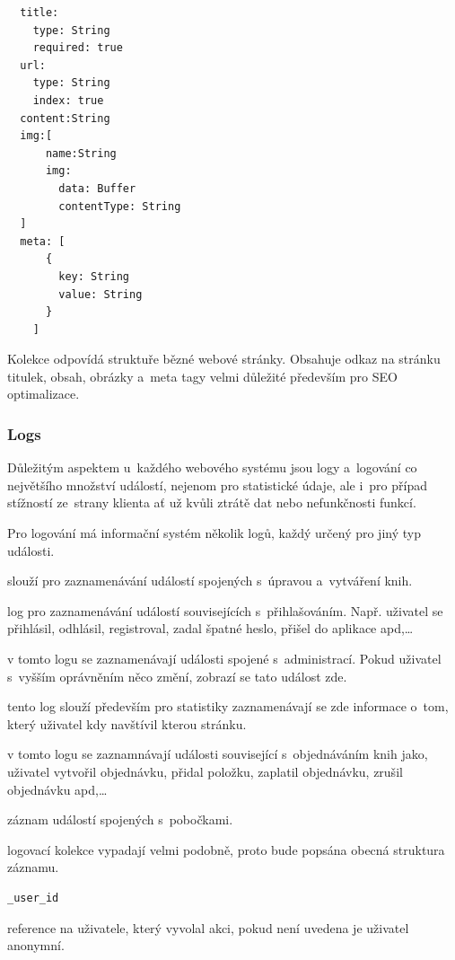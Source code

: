 \documentclass[a4paper,12pt,twoside,BCOR=10mm]{article}
\newenvironment{codeframe}{%
  \begin{Sbox} 
    \begin{minipage} 
      {\columnwidth-\leftmargin-\rightmargin-2\fboxsep-2\fboxrule-4pt} 
}{%

  \end{minipage} 
  \end{Sbox} 
  \begin{center} 
    \fcolorbox{black}{codeback}{\TheSbox} 
  \end{center} 
}
\begin{document}
\begin{codeframe}
  \begin{verbatim}
  title:
    type: String
    required: true
  url:
    type: String
    index: true
  content:String
  img:[
      name:String
      img:
        data: Buffer
        contentType: String
  ]
  meta: [
      {
        key: String
        value: String
      }
    ]
  \end{verbatim}
\end{codeframe}
Kolekce odpovídá struktuře bězné webové stránky. Obsahuje odkaz na stránku titulek, obsah, obrázky a~meta tagy velmi důležité především pro SEO optimalizace.

\subsubsection{Logs}
Důležitým aspektem u~každého webového systému jsou logy a~logování co největšího množství událostí, nejenom pro statistické údaje, ale i~pro případ stížností ze~strany klienta ať už kvůli ztrátě dat nebo nefunkčnosti funkcí.

Pro logování má informační systém několik logů, každý určený pro jiný typ události.

\begin{description}\label{database:log}
\item[Edit log] slouží pro zaznamenávání událostí spojených s~úpravou a~vytváření knih.
\item[Auth log] log pro zaznamenávání událostí souvisejících s~přihlašováním. Např. uživatel se přihlásil, odhlásil, registroval, zadal špatné heslo, přišel do aplikace apd,…
\item[Admin log] v tomto logu se zaznamenávají události spojené s~administrací. Pokud uživatel s~vyšším oprávněním něco změní, zobrazí se tato událost zde.
\item[Views log] tento log slouží především pro statistiky zaznamenávají se zde informace o~tom, který uživatel kdy navštívil kterou stránku.
\item[Orders log] v tomto logu se zaznamnávají události související s~objednáváním knih jako, uživatel vytvořil objednávku, přidal položku, zaplatil objednávku, zrušil objednávku apd,…
\item[Branches log] záznam událostí spojených s~pobočkami.
\end{description}
logovací kolekce vypadají velmi podobně, proto bude popsána obecná struktura záznamu.

\begin{codeframe}
  \begin{verbatim}
_user_id
  \end{verbatim}
\end{codeframe}
reference na uživatele, který vyvolal akci, pokud není uvedena je uživatel anonymní.
\end{document}
